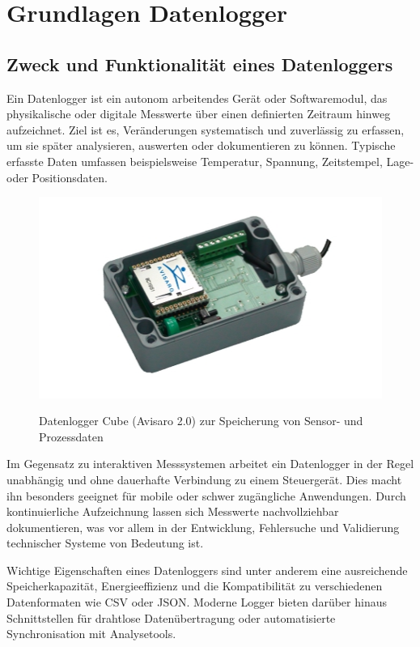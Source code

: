 \documentclass[a4paper, 12pt]{article} %
\begin{document}
\clearpage

\section{Grundlagen Datenlogger}
\subsection{Zweck und Funktionalität eines Datenloggers}
Ein Datenlogger ist ein autonom arbeitendes Gerät oder Softwaremodul, das physikalische oder digitale Messwerte über einen definierten 
Zeitraum hinweg aufzeichnet. Ziel ist es, Veränderungen systematisch und zuverlässig zu erfassen, um sie später analysieren, auswerten 
oder dokumentieren zu können. Typische erfasste Daten umfassen beispielsweise Temperatur, Spannung, Zeitstempel, Lage- oder Positionsdaten.

\begin{figure}[H]
    \includegraphics[width=1\linewidth]{images/Datalogger}\\[1ex]
    \centering
    \caption{Datenlogger Cube (Avisaro 2.0) zur Speicherung von Sensor- und Prozessdaten}
    \label{ABBILDUNG}
\end{figure}

Im Gegensatz zu interaktiven Messsystemen arbeitet ein Datenlogger in der Regel unabhängig und ohne dauerhafte Verbindung 
zu einem Steuergerät. Dies macht ihn besonders geeignet für mobile oder schwer zugängliche Anwendungen. Durch kontinuierliche 
Aufzeichnung lassen sich Messwerte nachvollziehbar dokumentieren, was vor allem in der Entwicklung, Fehlersuche und Validierung technischer 
Systeme von Bedeutung ist.

Wichtige Eigenschaften eines Datenloggers sind unter anderem eine ausreichende Speicherkapazität, 
Energieeffizienz und die Kompatibilität zu verschiedenen Datenformaten wie \acf{CSV} oder \acf{JSON}. Moderne Logger 
bieten darüber hinaus Schnittstellen für drahtlose Datenübertragung oder automatisierte Synchronisation mit Analysetools.
\end{document}
